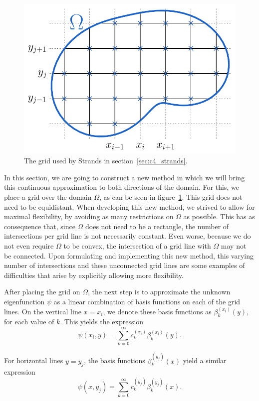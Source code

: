 \begin{figure}
    \begin{center}
        \includegraphics[width=.66\linewidth]{img/chapter4/the_method_grid.pdf}
        \caption{\label{fig:woven_method_grid} The grid used by Strands in section~\ref{sec:c4_strands}.}
    \end{center}
\end{figure}

In this section, we are going to construct a new method in which we will bring this continuous approximation to both directions of the domain. For this, we place a grid over the domain $\Omega$, as can be seen in figure~\ref{fig:woven_method_grid}. This grid does not need to be equidistant. When developing this new method, we strived to allow for maximal flexibility, by avoiding as many restrictions on $\Omega$ as possible. This has as consequence that, since $\Omega$ does not need to be a rectangle, the number of intersections per grid line is not necessarily constant. Even worse, because we do not even require $\Omega$ to be convex, the intersection of a grid line with $\Omega$ may not be connected. Upon formulating and implementing this new method, this varying number of intersections and these unconnected grid lines are some examples of difficulties that arise by explicitly allowing more flexibility.

After placing the grid on $\Omega$, the next step is to approximate the unknown eigenfunction $\psi$ as a linear combination of basis functions on each of the grid lines. On the vertical line $x = x_i$, we denote these basis functions as $\beta_k^{(x_i)}(y)$, for each value of $k$. This yields the expression
\begin{equation}\label{equ:c4_expression_on_lines_x}
    \psi(x_i, y) = \sum_{k=0}^\infty c_k^{(x_i)} \beta_k^{(x_i)}(y) \text{.}
\end{equation}

For horizontal lines $y = y_j$, the basis functions $\beta_k^{(y_j)}(x)$ yield a similar expression
\begin{equation}\label{equ:c4_expression_on_lines_y}
    \psi(x, y_j) = \sum_{k=0}^\infty c_k^{(y_j)} \beta_k^{(y_j)}(x) \text{.}
\end{equation}

